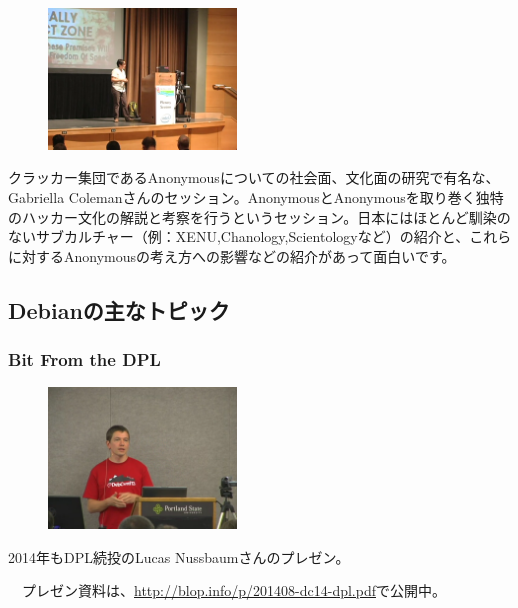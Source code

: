 \documentclass[mingoth,a4paper]{jsarticle}
\begin{document}
\begin{figure}
  \includegraphics[width=5cm]{image201409/weapon_geek.png}
\end{figure}

 クラッカー集団であるAnonymousについての社会面、文化面の研究で有名な、Gabriella Colemanさんのセッション。AnonymousとAnonymousを取り巻く独特のハッカー文化の解説と考察を行うというセッション。日本にはほとんど馴染のないサブカルチャー（例：XENU,Chanology,Scientologyなど）の紹介と、これらに対するAnonymousの考え方への影響などの紹介があって面白いです。

\subsection{Debianの主なトピック}

\subsubsection{Bit From the DPL}

\begin{figure}
  \includegraphics[width=5cm]{image201409/bit_dpl.png}
\end{figure}

 2014年もDPL続投のLucas Nussbaumさんのプレゼン。

　プレゼン資料は、\url{http://blop.info/p/201408-dc14-dpl.pdf}で公開中。
\end{document}

